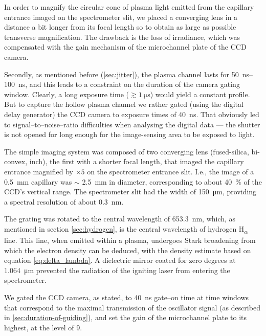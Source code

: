 \documentclass[justified,nofonts,nobib,openany]{tufte-book}
\begin{document}
In order to magnify the circular cone of plasma light emitted from the capillary entrance imaged on the spectrometer slit, we placed a converging lens in a distance a bit longer from its focal length so to obtain as large as possible transverse magnification. The drawback is the loss of irradiance, which was compensated with the gain mechanism of the microchannel plate of the CCD camera.

Secondly, as mentioned before (\ref{sec:jitter}), the plasma channel lasts for \SIrange{50}{100}{\ns}, and this leads to a constraint on the duration of the camera gating window. Clearly, a long exposure time ($\gtrsim \SI{1}{\us}$) would yield a constant profile. But to capture the hollow plasma channel we rather gated (using the digital delay generator) the CCD camera to exposure times of \SI{40}{\ns}. That obviously led to signal--to--noise--ratio difficulties when analysing the digital data --- the shutter is not opened for long enough for the image-sensing area to be exposed to light.

The simple imaging system was composed of two converging lens (fused-silica, bi-convex,  inch), the first with a shorter focal length, that imaged the capillary entrance magnified by $\times 5$ on the spectrometer entrance slit. I.e., the image of a \SI{0.5}{\mm} capillary was $\sim$ \SI{2.5}{\mm} in diameter, corresponding to about \SI{40}{\percent} of the CCD's vertical range. The spectrometer slit had the width of \SI{150}{\micro\metre}, providing a spectral resolution of about \SI{0.3}{\nm}.

The grating was rotated to the central wavelength of \SI{653.3}{\nm}, which, as mentioned in section \ref{sec:hydrogen}, is the central wavelength of hydrogen H\textsubscript{$\alpha$} line. This line, when emitted within a plasma, undergoes Stark broadening from which the electron density can be deduced, with the density estimate based on equation \ref{eq:delta_lambda}. A dielectric mirror coated for zero degrees at \SI{1.064}{\um} prevented the radiation of the igniting laser from entering the spectrometer.

We gated the CCD camera, as stated, to \SI{40}{\ns} gate--on time at time windows that correspond to the maximal transmission of the oscillator signal (as described in \ref{sec:duration-of-guiding}), and set the gain of the microchannel plate to its highest, at the level of 9.
\end{document}
